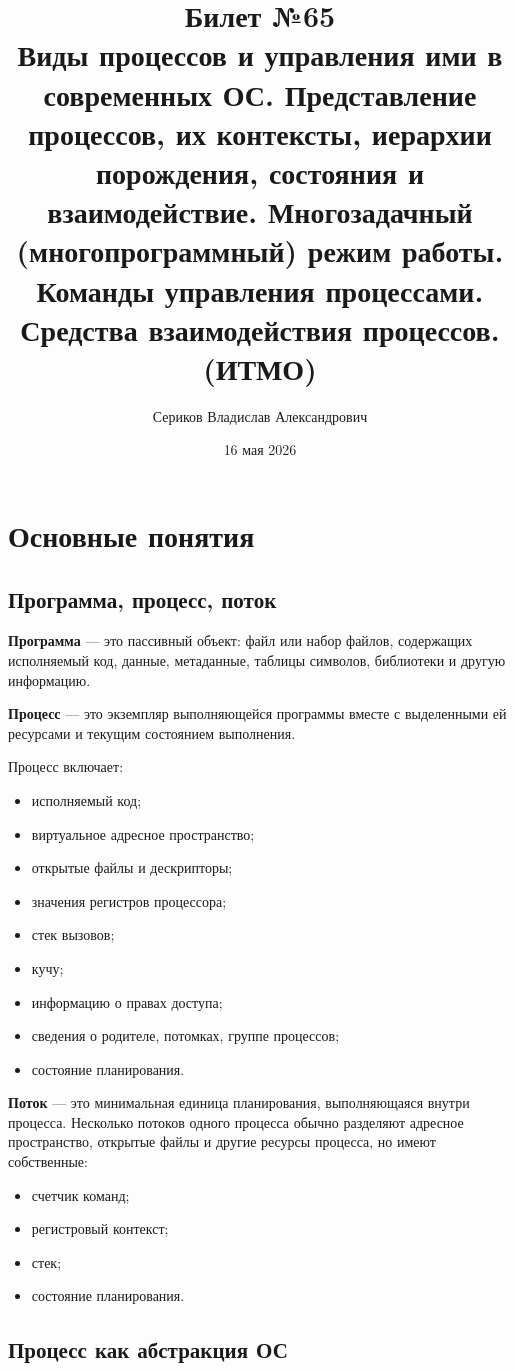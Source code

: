 \documentclass[12pt,a4paper]{article}
\title{Билет №65 \\ \small Виды процессов и управления ими в современных ОС. Представление процессов, их контексты, иерархии порождения, состояния и взаимодействие. Многозадачный (многопрограммный) режим работы. Команды управления процессами. Средства взаимодействия процессов. (ИТМО)}
\author{Сериков Владислав Александрович}
\date{16 мая 2026}
\begin{document}
\maketitle
\tableofcontents
\newpage

\section{Основные понятия}

\subsection{Программа, процесс, поток}

\textbf{Программа} --- это пассивный объект: файл или набор файлов, содержащих исполняемый код, данные, метаданные, таблицы символов, библиотеки и другую информацию.

\textbf{Процесс} --- это экземпляр выполняющейся программы вместе с выделенными ей ресурсами и текущим состоянием выполнения.

Процесс включает:
\begin{itemize}
    \item исполняемый код;
    \item виртуальное адресное пространство;
    \item открытые файлы и дескрипторы;
    \item значения регистров процессора;
    \item стек вызовов;
    \item кучу;
    \item информацию о правах доступа;
    \item сведения о родителе, потомках, группе процессов;
    \item состояние планирования.
\end{itemize}

\textbf{Поток} --- это минимальная единица планирования, выполняющаяся внутри процесса. Несколько потоков одного процесса обычно разделяют адресное пространство, открытые файлы и другие ресурсы процесса, но имеют собственные:
\begin{itemize}
    \item счетчик команд;
    \item регистровый контекст;
    \item стек;
    \item состояние планирования.
\end{itemize}

\subsection{Процесс как абстракция ОС}
\end{document}
